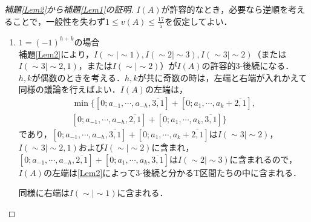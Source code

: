 \documentclass[10pt,a4paper]{ujarticle}
\theoremstyle{definition}
\begin{document}
\begin{proof}[補題\ref{Lem2}から補題\ref{Lem1}の証明]
 $I(A)$が許容的なとき，必要なら逆順を考えることで，一般性を失わず$1\le v(A) \le \frac{17}{5}$を仮定してよい．

 \begin{enumerate}
  \item $1= (-1)^{h + k}$の場合 \\
  補題\ref{Lem2}により，$I(\sim| \sim 1), I(\sim 2| \sim 3), I(\sim 3| \sim 2)$（または$I(\sim 3| \sim 2, 1)$，または$I(\sim| \sim 2)$）が$I(A)$の許容的$3$-後続になる．
  $h,k$が偶数のときを考える．$h,k$が共に奇数の時は，左端と右端が入れかえて同様の議論を行えばよい．$I(A)$の左端は，
  \begin{align*}
    \min \{[0; a_{-1},\cdots , a_{-h}, \overline{3, 1}] + [0; a_1,\cdots , a_{k} + \overline{2, 1}],\\
    [0; a_{-1},\cdots , a_{-h}, \overline{2, 1}] + [0; a_1,\cdots , a_{k}, \overline{3, 1}] \}
  \end{align*}
  であり，$[0; a_{-1},\cdots , a_{-h}, \overline{3, 1}] + [0; a_1,\cdots , a_{k} + \overline{2, 1}]$は$I(\sim 3| \sim 2)$，$I(\sim 3| \sim 2, 1)$および$I(\sim| \sim 2)$に含まれ，
  $[0; a_{-1},\cdots , a_{-h}, \overline{2, 1}] + [0; a_1,\cdots , a_{k}, \overline{3, 1}]$は$I(\sim 2| \sim 3)$に含まれるので，
  $I(A)$の左端は\ref{Lem2}によって$3$-後続と分かるT区間たちの中に含まれる．
  
  同様に右端は$I(\sim| \sim 1)$に含まれる．


\end{enumerate}
\end{proof}
\end{document}
